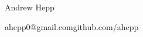 \begin{center}
   \Huge Andrew Hepp \normalsize
\end{center}
ahepp0@gmail.com\hfill github.com/ahepp
